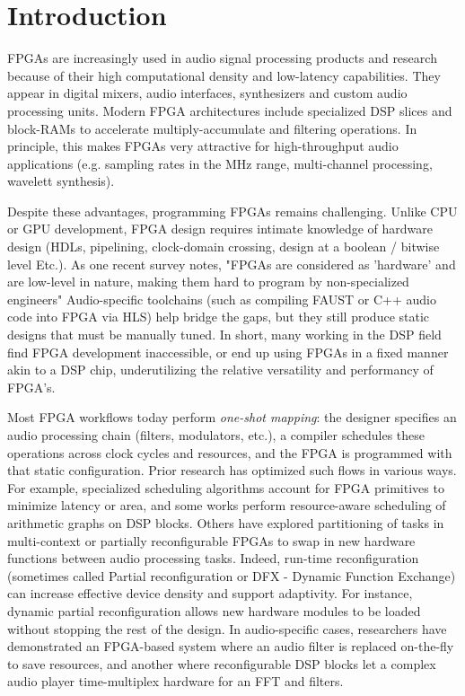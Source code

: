 \chapter{Introduction}

FPGAs are increasingly used in audio signal processing products and research because of their high computational density and low-latency capabilities\cite{IEEE8187326}. They appear in digital mixers, audio interfaces, synthesizers and custom audio processing units. Modern FPGA architectures include specialized DSP slices and block-RAMs to accelerate multiply-accumulate and filtering operations. In principle, this makes FPGAs very attractive for high-throughput audio applications (e.g. sampling rates in the MHz range, multi-channel processing, wavelett synthesis).
\bigskip

\noindent Despite these advantages, programming FPGAs remains challenging. Unlike CPU or GPU development, FPGA design requires intimate knowledge of hardware design (HDLs, pipelining, clock-domain crossing, design at a boolean / bitwise level Etc.). As one recent survey notes, "FPGAs are considered as 'hardware' and are low-level in nature, making them hard to program by non-specialized engineers"\cite{IEEE8187326} Audio-specific toolchains (such as compiling FAUST or C++ audio code into FPGA via HLS) help bridge the gaps, but they still produce static designs that must be manually tuned. In short, many working in the DSP field find FPGA development inaccessible, or end up using FPGAs in a fixed manner akin to a DSP chip, underutilizing the relative versatility and performancy of FPGA's.
\bigskip

\noindent Most FPGA workflows today perform \textit{one-shot mapping}: the designer specifies an audio processing chain (filters, modulators, etc.), a compiler schedules these operations across clock cycles and resources, and the FPGA is programmed with that static configuration. Prior research has optimized such flows in various ways\cite{SinhaSrikanthan2014}. For example, specialized scheduling algorithms account for FPGA primitives to minimize latency or area, and some works perform resource-aware scheduling of arithmetic graphs on DSP blocks. Others have explored partitioning of tasks in multi-context or partially reconfigurable FPGAs to swap in new hardware functions between audio processing tasks\cite{Bhandari2012}. Indeed, run-time reconfiguration (sometimes called Partial reconfiguration or DFX - Dynamic Function Exchange) can increase effective device density and support adaptivity. For instance, dynamic partial reconfiguration allows new hardware modules to be loaded without stopping the rest of the design. In audio-specific cases, researchers have demonstrated an FPGA-based system where an audio filter is replaced on-the-fly to save resources\cite{Silva2016}, and another where reconfigurable DSP blocks let a complex audio player time-multiplex hardware for an FFT and filters\cite{Das2017}.
\bigskip

